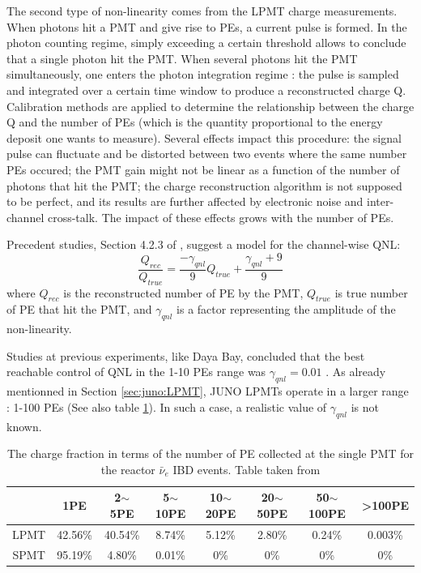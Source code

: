 \documentclass[../main.tex]{subfiles}
\begin{document}
The second type of non-linearity comes from the LPMT charge measurements. When photons hit a PMT and give rise to PEs, a current pulse is formed. In the photon counting regime, simply exceeding a certain threshold allows to conclude that a single photon hit the PMT. When several photons hit the PMT simultaneously, one enters the photon integration regime : the pulse is sampled and integrated over a certain time window to produce a reconstructed charge Q. Calibration methods are applied to determine the relationship between the charge Q and the number of PEs (which is the quantity proportional to the energy deposit one wants to measure). Several effects impact this procedure: the signal pulse can fluctuate and be distorted between two events where the same number PEs occured; the PMT gain might not be linear as a function of the number of photons that hit the PMT; the charge reconstruction algorithm is not supposed to be perfect, and its results are further affected by electronic noise and inter-channel cross-talk. The impact of these effects grows with the number of PEs.

Precedent studies, Section 4.2.3 of \cite{han_dual_2021}, suggest a model for the channel-wise QNL:
\begin{equation}
  \label{eq:joint_fit:gamma_yang}
  \frac{Q_{rec}}{Q_{true}} = \frac{-\gamma_{qnl}}{9} Q_{true} + \frac{\gamma_{qnl} + 9}{9}
\end{equation}
where $Q_{rec}$ is the reconstructed number of PE by the PMT, $Q_{true}$ is true number of PE that hit the PMT, and $\gamma_{qnl}$ is a factor representing the amplitude of the non-linearity.

Studies at previous experiments, like Daya Bay, concluded that the best reachable control of QNL in the 1-10 PEs range was $\gamma_{qnl}=0.01$ \cite{collaboration_high_2019}.
As already mentionned in Section \ref{sec:juno:LPMT}, JUNO LPMTs operate in a larger range : 1-100 PEs (See also table \ref{tab:joint_fit:charge_frac}). In such a case, a realistic value of $\gamma_{qnl}$ is not known.

\begin{table}[ht]
  \centering
  \begin{tabular}{c|c|c|c|c|c|c|c}
        &1PE &2$\sim$5PE& 5$\sim$10PE & 10$\sim$20PE & 20$\sim$50PE & 50$\sim$100PE & >100PE \\
      \hline
    LPMT &42.56\% & 40.54\% & 8.74\% & 5.12\% & 2.80\% & 0.24\% & 0.003\% \\
    SPMT &95.19\% & 4.80\%  & 0.01\% & 0\%    & 0\%    & 0\%    & 0\% \\
    \hline
  \end{tabular}
  \caption{The charge fraction in terms of the number of PE collected at the single PMT for the reactor $\bar{\nu}_e$ IBD events. Table taken from \cite{han_dual_2021}}
  \label{tab:joint_fit:charge_frac}
\end{table}
\end{document}
